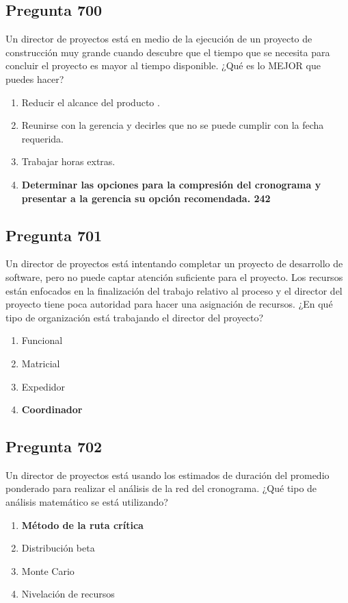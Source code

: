 \documentclass[11pt,a4paper]{article}
\begin{document}
\subsection*{Pregunta 700}
Un director de proyectos está en medio de la ejecución de un proyecto de construcción muy grande cuando descubre que el tiempo que se necesita para concluir el proyecto es mayor al tiempo disponible. ¿Qué es lo MEJOR que puedes hacer?

\begin{enumerate}[label=\alph*)]
  \item Reducir el alcance del producto .
  \item Reunirse con la gerencia y decirles que no se puede cumplir con la fecha requerida.
  \item Trabajar horas extras.
  \item \textbf{Determinar las opciones para la compresión del cronograma y presentar a la gerencia su opción recomendada. 242}
\end{enumerate}

\subsection*{Pregunta 701}
Un director de proyectos está intentando completar un proyecto de desarrollo de software, pero no puede captar atención suficiente para el proyecto. Los recursos están enfocados en la finalización del trabajo relativo al proceso y el director del proyecto tiene poca autoridad para hacer una asignación de recursos. ¿En qué tipo de organización está trabajando el director del proyecto?

\begin{enumerate}[label=\alph*)]
  \item Funcional
  \item Matricial
  \item Expedidor
  \item \textbf{Coordinador}
\end{enumerate}

\subsection*{Pregunta 702}
Un director de proyectos está usando los estimados de duración del promedio ponderado para realizar el análisis de la red del cronograma. ¿Qué tipo de análisis matemático se está utilizando?

\begin{enumerate}[label=\alph*)]
  \item \textbf{Método de la ruta crítica}
  \item Distribución beta
  \item Monte Cario
  \item Nivelación de recursos
\end{enumerate}
\end{document}

